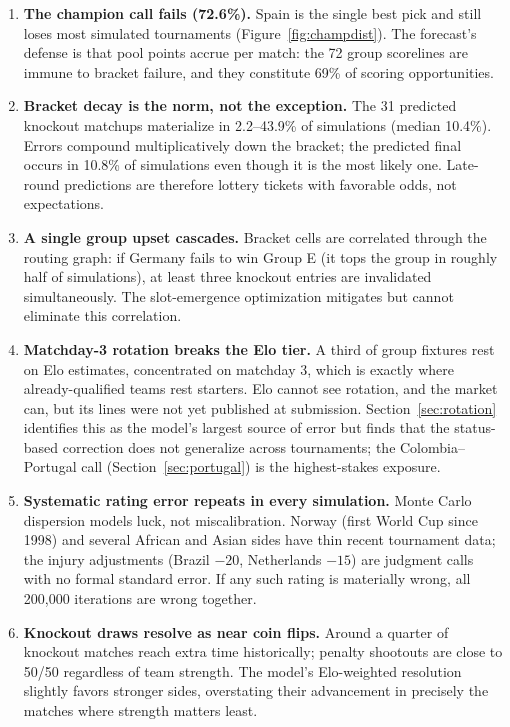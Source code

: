 \documentclass[11pt,a4paper]{article}
\begin{document}
\begin{enumerate}
\item \textbf{The champion call fails (72.6\%).} Spain is the single best pick and still loses most simulated tournaments (Figure~\ref{fig:champdist}). The forecast's defense is that pool points accrue per match: the 72 group scorelines are immune to bracket failure, and they constitute 69\% of scoring opportunities.
\item \textbf{Bracket decay is the norm, not the exception.} The 31 predicted knockout matchups materialize in 2.2--43.9\% of simulations (median 10.4\%). Errors compound multiplicatively down the bracket; the predicted final occurs in 10.8\% of simulations even though it is the most likely one. Late-round predictions are therefore lottery tickets with favorable odds, not expectations.
\item \textbf{A single group upset cascades.} Bracket cells are correlated through the routing graph: if Germany fails to win Group E (it tops the group in roughly half of simulations), at least three knockout entries are invalidated simultaneously. The slot-emergence optimization mitigates but cannot eliminate this correlation.
\item \textbf{Matchday-3 rotation breaks the Elo tier.} A third of group fixtures rest on Elo estimates, concentrated on matchday 3, which is exactly where already-qualified teams rest starters. Elo cannot see rotation, and the market can, but its lines were not yet published at submission. Section~\ref{sec:rotation} identifies this as the model's largest source of error but finds that the status-based correction does not generalize across tournaments; the Colombia--Portugal call (Section~\ref{sec:portugal}) is the highest-stakes exposure.
\item \textbf{Systematic rating error repeats in every simulation.} Monte Carlo dispersion models luck, not miscalibration. Norway (first World Cup since 1998) and several African and Asian sides have thin recent tournament data; the injury adjustments (Brazil $-20$, Netherlands $-15$) are judgment calls with no formal standard error. If any such rating is materially wrong, all 200{,}000 iterations are wrong together.
\item \textbf{Knockout draws resolve as near coin flips.} Around a quarter of knockout matches reach extra time historically; penalty shootouts are close to 50/50 regardless of team strength. The model's Elo-weighted resolution slightly favors stronger sides, overstating their advancement in precisely the matches where strength matters least.
\end{enumerate}
\end{document}
